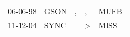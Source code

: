 \begin{supertabular}{p{0.07\textwidth}p{0.06\textwidth}p{0.02\textwidth}p{0.02\textwidth}p{0.06\textwidth}}
 06-06-98\textsuperscript{} &  GSON\textsuperscript{} &  , &             , &  MUFB\textsuperscript{} \\
 11-12-04\textsuperscript{} &  SYNC\textsuperscript{} &    &  \textgreater &  MISS\textsuperscript{} \\
\end{supertabular}
